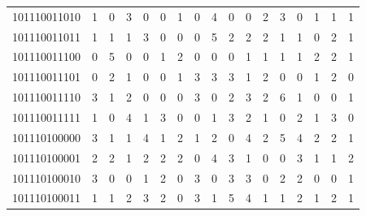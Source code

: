 \documentclass[10pt,a4paper]{article}
\begin{document}
\begin{longtable}{ |c|c|c|c|c|c|c|c|c|c|c|c|c|c|c|c|c| }
    101110011010              & 1                            & 0                                & 3                            & 0                              & 0   & 1   & 0   & 4   & 0   & 0   & 2   & 3   & 0   & 1   & 1   & 1   \\
    101110011011              & 1                            & 1                                & 1                            & 3                              & 0   & 0   & 0   & 5   & 2   & 2   & 2   & 1   & 1   & 0   & 2   & 1   \\
    101110011100              & 0                            & 5                                & 0                            & 0                              & 1   & 2   & 0   & 0   & 0   & 1   & 1   & 1   & 1   & 2   & 2   & 1   \\
    101110011101              & 0                            & 2                                & 1                            & 0                              & 0   & 1   & 3   & 3   & 3   & 1   & 2   & 0   & 0   & 1   & 2   & 0   \\
    101110011110              & 3                            & 1                                & 2                            & 0                              & 0   & 0   & 3   & 0   & 2   & 3   & 2   & 6   & 1   & 0   & 0   & 1   \\
    101110011111              & 1                            & 0                                & 4                            & 1                              & 3   & 0   & 0   & 1   & 3   & 2   & 1   & 0   & 2   & 1   & 3   & 0   \\
    101110100000              & 3                            & 1                                & 1                            & 4                              & 1   & 2   & 1   & 2   & 0   & 4   & 2   & 5   & 4   & 2   & 2   & 1   \\
    101110100001              & 2                            & 2                                & 1                            & 2                              & 2   & 2   & 0   & 4   & 3   & 1   & 0   & 0   & 3   & 1   & 1   & 2   \\
    101110100010              & 3                            & 0                                & 0                            & 1                              & 2   & 0   & 3   & 0   & 3   & 3   & 0   & 2   & 2   & 0   & 0   & 1   \\
    101110100011              & 1                            & 1                                & 2                            & 3                              & 2   & 0   & 3   & 1   & 5   & 4   & 1   & 1   & 2   & 1   & 2   & 1   \\

\end{longtable}
\end{document}
